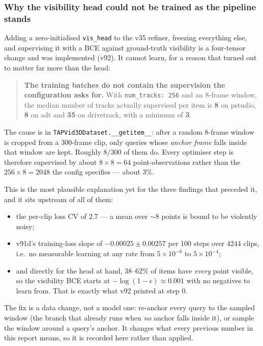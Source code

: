 \documentclass[11pt,a4paper]{article}
\begin{document}
\subsubsection{Why the visibility head could not be trained as the pipeline stands}
\label{sec:vis-head-blocked}
Adding a zero-initialised \texttt{vis\_head} to the v35 refiner, freezing everything else, and
supervising it with a BCE against ground-truth visibility is a four-tensor change and was
implemented (v92). It cannot learn, for a reason that turned out to matter far more than the head:

\begin{quote}
\textbf{The training batches do not contain the supervision the configuration asks for.} With
\texttt{num\_tracks: 256} and an $8$-frame window, the median number of tracks actually supervised
per item is \textbf{8} on pstudio, \textbf{8} on adt and \textbf{35} on drivetrack, with a minimum
of \textbf{3}.
\end{quote}

The cause is in \texttt{TAPVid3DDataset.\_\_getitem\_\_}: after a random $8$-frame window is cropped
from a $300$-frame clip, only queries whose \emph{anchor frame} falls inside that window are kept.
Roughly $8/300$ of them do. Every optimiser step is therefore supervised by about $8\times8 = 64$
point-observations rather than the $256\times8 = 2048$ the config specifies --- about $3\%$.

This is the most plausible explanation yet for the three findings that preceded it, and it sits
upstream of all of them:
\begin{itemize}
  \item the per-clip loss CV of $2.7$ --- a mean over $\sim$8 points is bound to
        be violently noisy;
  \item v91d's training-loss slope of $-0.00025\pm0.00257$ per 100 steps over 4244 clips, i.e.\ no
        measurable learning at any rate from $5\times10^{-6}$ to $5\times10^{-4}$;
  \item and directly for the head at hand, $38$--$62\%$ of items have \emph{every} point visible,
        so the visibility BCE starts at $-\log(1-\epsilon)\approx0.001$ with no negatives to learn
        from. That is exactly what v92 printed at step 0.
\end{itemize}

The fix is a data change, not a model one: re-anchor every query to the sampled window (the branch
that already runs when \emph{no} anchor falls inside it), or sample the window around a query's
anchor. It changes what every previous number in this report means, so it is recorded here rather
than applied.
\end{document}
